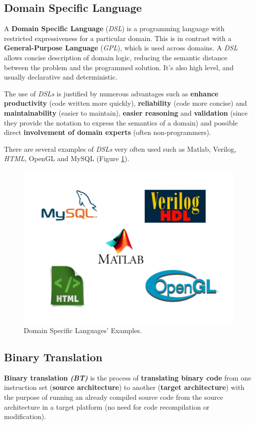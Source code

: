\subsection{Domain Specific Language}

A \textbf{Domain Specific Language} (\textit{DSL}) is a programming language with restricted expressiveness for a particular domain. This is in contrast with a \textbf{General-Purpose Language} (\textit{GPL}), which is used across domains. A \textit{DSL} allows concise description of domain logic, reducing the semantic distance between the problem and the programmed solution. It's also high level, and usually declarative and deterministic. \cite{Fowler:2010:DSL:1809745}

The use of \textit{DSLs} is justified by numerous advantages such as \textbf{enhance productivity} (code written more quickly), \textbf{reliability} (code more concise) and \textbf{maintainability} (easier to maintain), \textbf{easier reasoning} and \textbf{validation} (since they provide the notation to express the semantics of a domain) and possible direct \textbf{involvement of domain experts} (often non-programmers). \cite{DSL1} \cite{DSL_site}

There are several examples of \textit{DSLs} very often used such as Matlab, Verilog, \textit{HTML}, OpenGL and MySQL (Figure \ref{fig:A_DSLexamples}).

\begin{figure}[!htb]
\centering
\includegraphics[scale=0.7]{images/A_DSLexamples}
\caption{Domain Specific Languages' Examples.}
\label{fig:A_DSLexamples} 
\end{figure}


\subsection{Binary Translation}\textit{}
\textbf{Binary translation} \textbf{\textit{(BT)}} is the process of \textbf{translating binary code} from one instruction set (\textbf{source architecture}) to another (\textbf{target architecture}) with the purpose of running an already compiled source code from the source architecture in a target platform (no need for code recompilation or modification). \cite{BinaryTranslation} 

